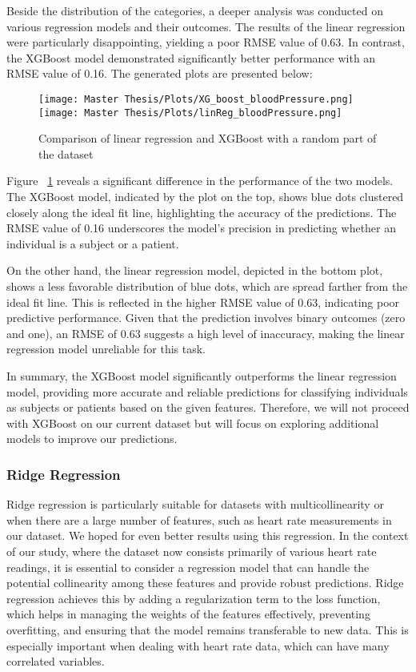 Beside the distribution of the categories, a deeper analysis was conducted on various regression models and their outcomes. The results of the linear regression were particularly disappointing, yielding a poor RMSE value of 0.63. In contrast, the XGBoost model demonstrated significantly better performance with an RMSE value of 0.16. The generated plots are presented below:

\FloatBarrier
\begin{figure}[h]
    \centering
    \texttt{[image: Master Thesis/Plots/XG\_boost\_bloodPressure.png]}
    \hspace{0.5cm} %
    \texttt{[image: Master Thesis/Plots/linReg\_bloodPressure.png]}
    \caption{Comparison of linear regression and XGBoost with a random part of the dataset}
    \label{fig:complinregXGBoost}
\end{figure}
\FloatBarrier

Figure ~\ref{fig:complinregXGBoost} reveals a significant difference in the performance of the two models. The XGBoost model, indicated by the plot on the top, shows blue dots clustered closely along the ideal fit line, highlighting the accuracy of the predictions. The RMSE value of 0.16 underscores the model's precision in predicting whether an individual is a subject or a patient.

On the other hand, the linear regression model, depicted in the bottom plot, shows a less favorable distribution of blue dots, which are spread farther from the ideal fit line. This is reflected in the higher RMSE value of 0.63, indicating poor predictive performance. Given that the prediction involves binary outcomes (zero and one), an RMSE of 0.63 suggests a high level of inaccuracy, making the linear regression model unreliable for this task.

In summary, the XGBoost model significantly outperforms the linear regression model, providing more accurate and reliable predictions for classifying individuals as subjects or patients based on the given features. Therefore, we will not proceed with XGBoost on our current dataset but will focus on exploring additional models to improve our predictions.

\subsubsection{Ridge Regression}
Ridge regression is particularly suitable for datasets with multicollinearity or when there are a large number of features, such as heart rate measurements in our dataset. We hoped for even better results using this regression. In the context of our study, where the dataset now consists primarily of various heart rate readings, it is essential to consider a regression model that can handle the potential collinearity among these features and provide robust predictions. Ridge regression achieves this by adding a regularization term to the loss function, which helps in managing the weights of the features effectively, preventing overfitting, and ensuring that the model remains transferable to new data. This is especially important when dealing with heart rate data, which can have many correlated variables.

